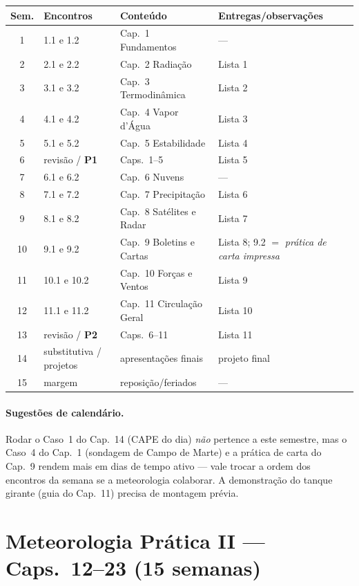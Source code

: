 \documentclass[11pt]{article}
\begin{document}
\begin{center}
\begin{tabular}{clll}
\hline
Sem. & Encontros & Conteúdo & Entregas/observações \\
\hline
1 & 1.1 e 1.2 & Cap.~1 Fundamentos & --- \\
2 & 2.1 e 2.2 & Cap.~2 Radiação & Lista 1 \\
3 & 3.1 e 3.2 & Cap.~3 Termodinâmica & Lista 2 \\
4 & 4.1 e 4.2 & Cap.~4 Vapor d'Água & Lista 3 \\
5 & 5.1 e 5.2 & Cap.~5 Estabilidade & Lista 4 \\
6 & revisão / \textbf{P1} & Caps.~1--5 & Lista 5 \\
7 & 6.1 e 6.2 & Cap.~6 Nuvens & --- \\
8 & 7.1 e 7.2 & Cap.~7 Precipitação & Lista 6 \\
9 & 8.1 e 8.2 & Cap.~8 Satélites e Radar & Lista 7 \\
10 & 9.1 e 9.2 & Cap.~9 Boletins e Cartas & Lista 8;
9.2 $=$ \emph{prática de carta impressa} \\
11 & 10.1 e 10.2 & Cap.~10 Forças e Ventos & Lista 9 \\
12 & 11.1 e 11.2 & Cap.~11 Circulação Geral & Lista 10 \\
13 & revisão / \textbf{P2} & Caps.~6--11 & Lista 11 \\
14 & substitutiva / projetos & apresentações finais & projeto final \\
15 & margem & reposição/feriados & --- \\
\hline
\end{tabular}
\end{center}

\paragraph{Sugestões de calendário.} Rodar o Caso~1 do Cap.~14 (CAPE
do dia) \emph{não} pertence a este semestre, mas o Caso~4 do Cap.~1
(sondagem de Campo de Marte) e a prática de carta do Cap.~9 rendem
mais em dias de tempo ativo — vale trocar a ordem dos encontros da
semana se a meteorologia colaborar. A demonstração do tanque girante
(guia do Cap.~11) precisa de montagem prévia.

\clearpage
\section*{Meteorologia Prática II --- Caps.~12--23 (15 semanas)}
\end{document}
